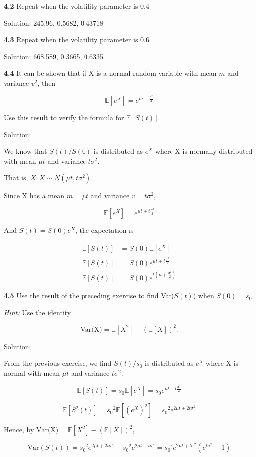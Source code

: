 \documentclass[12pt]{article}
\begin{document}
\noindent \textbf{4.2} Repeat when the volatility parameter is 0.4


Solution: 245.96, 0.5682, 0.43718

\noindent \textbf{4.3} Repeat when the volatility parameter is 0.6

Solution: 668.589, 0.3665, 0.6335

\noindent \textbf{4.4} It can be shown that if X is a normal random variable with mean $m$ and variance $v^2$, then

\[
\mathbb{E}[e^X] = e^{m + \frac{v^2}{2}}
\]

\noindent Use this result to verify the formula for $\mathbb{E}[S(t)]$.


Solution: 

We know that $S(t) / S(0)$  is distributed as $e^X$ where X is normally distributed with mean $\mu t$ and variance $t\sigma^2$. 

That is, $X: X \sim N(\mu t, t\sigma^2)$. 

Since X has a mean $m = \mu t$ and variance $v = t\sigma^2$,

\[
\mathbb{E}[e^X] = e^{\mu t + t\frac{\sigma^2}{2}}
\]

And $S(t) = S(0)e^X$, the expectation is 

\begin{align*}
    \mathbb{E}[S(t)] &= S(0)\mathbb{E}[e^X] \\
    \mathbb{E}[S(t)] &= S(0)e^{\mu t + t\frac{\sigma^2}{2}} \\
    \mathbb{E}[S(t)] &= S(0)e^{t(\mu + \frac{\sigma^2}{2})} 
\end{align*}



\noindent \textbf{4.5} Use the result of the preceding exercise to find Var($S(t)$) when $S(0) = s_0$

\textit{Hint:} Use the identity

\[
\text{Var(X)} = \mathbb{E}[X^2] - (\mathbb{E}[X])^2.
\]

Solution:

From the previous exercise, we find $S(t) / s_0$ is distributed as $e^X$ where X is normal with mean $\mu t$ and variance $t\sigma^2$.

\[
\mathbb{E}[S(t)] = s_0 \mathbb{E}[e^X] = s_0 e^{\mu t + t \frac{\sigma^2}{2}}
\]

\[
\mathbb{E}[S^2(t)] = {s_0}^2 \mathbb{E}[(e^X)^2] = {s_0}^2 e^{2\mu t + 2 t\sigma^2}
\]

Hence, by $\text{Var(X)} = \mathbb{E}[X^2] - (\mathbb{E}[X])^2$, 

\[
\text{Var}(S(t)) = {s_0}^2 e^{2\mu t + 2t\sigma^2}- {s_0}^2 e^{2 \mu t + t \sigma^2} = {s_0}^2 e^{2\mu t + t\sigma^2}(e^{t\sigma^2} - 1) 
\]
\end{document}
